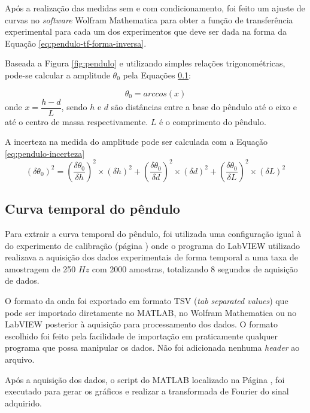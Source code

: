 \documentclass[a4paper]{instrumentacao}
\begin{document}
Após a realização das medidas sem e com condicionamento, foi feito um ajuste de curvas no \textit{software} Wolfram Mathematica para obter a função de transferência experimental para cada um dos experimentos que deve ser dada na forma da Equação \ref{eq:pendulo-tf-forma-inversa}.

Baseada  a Figura \ref{fig:pendulo} e  utilizando simples relações trigonométricas, pode-se calcular a amplitude $\theta_{0}$ pela Equações \ref{}:

\begin{equation}
	\theta_{0} = arccos(x)
	\label{eq:pendulo-angulo0}
\end{equation}
\noindent onde $x = \dfrac{h-d}{L}$, sendo $h$ e $d$ são distâncias entre a base do pêndulo até o eixo e até o centro de massa respectivamente. $L$ é o comprimento do pêndulo.

A incerteza na medida do amplitude pode ser calculada com a Equação \ref{eq:pendulo-incerteza}
\begin{equation}
	(\delta\theta_{0})^2 = (\dfrac{\delta\theta_{0}}{\delta h})^2 \times (\delta h)^2 + (\dfrac{\delta\theta_{0}}{\delta d})^2 \times (\delta d)^2 + (\dfrac{\delta\theta_{0}}{\delta L})^2 \times (\delta L)^2
	\label{eq:pendulo-incerteza}
\end{equation}


\subsection{Curva temporal do pêndulo}

Para extrair a curva temporal do pêndulo, foi utilizada uma configuração igual à do experimento de calibração (página \pageref{sec:pendulo-calibracao-condicionado}) onde o programa do LabVIEW utilizado realizava a aquisição dos dados experimentais de forma temporal a uma taxa de amostragem de 250 $Hz$ com 2000 amostras, totalizando 8 segundos de aquisição de dados.

O formato da onda foi exportado em formato TSV (\textit{tab separated values}) que pode ser importado diretamente no MATLAB, no Wolfram Mathematica ou no LabVIEW posterior à aquisição para processamento dos dados. O formato escolhido foi feito pela facilidade de importação em praticamente qualquer programa que possa manipular os dados. Não foi adicionada nenhuma \textit{header} ao arquivo.

Após a aquisição dos dados, o script do MATLAB localizado na Página \pageref{att:script-matlab}, foi executado para gerar os gráficos e realizar a transformada de Fourier do sinal adquirido.
\end{document}
